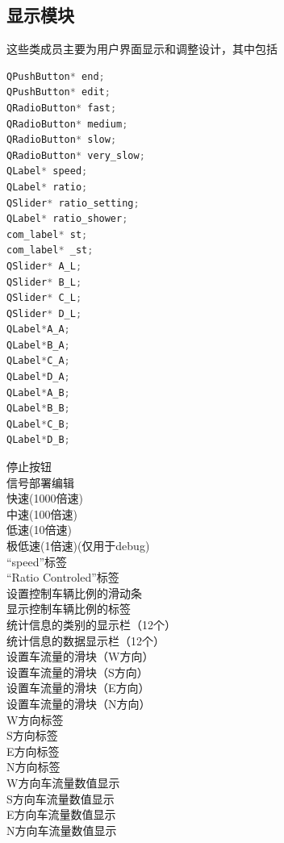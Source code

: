 \documentclass[UTF8,a4paper]{ctexart}
\begin{document}
\subsection{显示模块}
这些类成员主要为用户界面显示和调整设计，其中包括
\begin{multicols}{2}
\begin{lstlisting}[language=C++]
QPushButton* end;
QPushButton* edit;
QRadioButton* fast;
QRadioButton* medium;
QRadioButton* slow;
QRadioButton* very_slow;
QLabel* speed;
QLabel* ratio;
QSlider* ratio_setting;
QLabel* ratio_shower;
com_label* st;
com_label* _st;
QSlider* A_L;
QSlider* B_L;
QSlider* C_L;
QSlider* D_L;
QLabel*A_A;
QLabel*B_A;
QLabel*C_A;
QLabel*D_A;
QLabel*A_B;
QLabel*B_B;
QLabel*C_B;
QLabel*D_B;
\end{lstlisting}
停止按钮 \\
信号部署编辑 \\
快速(1000倍速) \\
中速(100倍速) \\
低速(10倍速) \\
极低速(1倍速)(仅用于debug) \\
“speed”标签\\
“Ratio Controled”标签\\
设置控制车辆比例的滑动条\\
显示控制车辆比例的标签\\
统计信息的类别的显示栏（12个）\\
统计信息的数据显示栏（12个）\\
设置车流量的滑块（W方向）\\
设置车流量的滑块（S方向）\\
设置车流量的滑块（E方向）\\
设置车流量的滑块（N方向）\\
W方向标签\\
S方向标签\\
E方向标签\\
N方向标签\\
W方向车流量数值显示\\
S方向车流量数值显示\\
E方向车流量数值显示\\
N方向车流量数值显示\\
\end{multicols}
\end{document}
